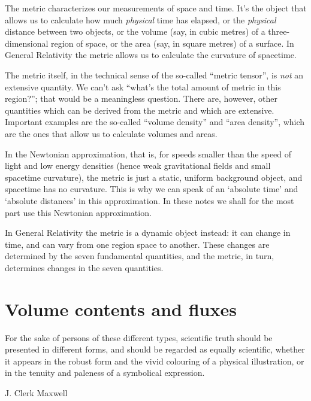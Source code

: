 \documentclass[a4paper,12pt,%
onecolumn,oneside,%
british%
]{memoir}
\renewcommand*{\|}[1][]{\nonscript\:#1\vert\nonscript\:\mathopen{}}
\begin{document}
The metric characterizes our measurements of space and time. It's the object that allows us to calculate how much \emph{physical} time has elapsed, or the \emph{physical} distance between two objects, or the volume (say, in cubic metres) of a three-dimensional region of space, or the area (say, in square metres) of a surface. In General Relativity the metric allows us to calculate the curvature of spacetime.

The metric itself, in the technical sense of the so-called \enquote{metric tensor}, is \emph{not} an extensive quantity. We can't ask \enquote{what's the total amount of metric in this region?}; that would be a meaningless question. There are, however, other quantities which can be derived from the metric and which are extensive. Important examples are the so-called \enquote{volume density} and \enquote{area density}, which are the ones that allow us to calculate volumes and areas.

In the Newtonian approximation, that is, for speeds smaller than the speed of light and low energy densities (hence weak gravitational fields and small spacetime curvature), the metric is just a static, uniform background object, and spacetime has no curvature. This is why we can speak of an \enquote*{absolute time} and \enquote*{absolute distances} in this approximation. In these notes we shall for the most part use this Newtonian approximation.

In General Relativity the metric is a dynamic object instead: it can change in time, and can vary from one region space to another. These changes are determined by the seven fundamental quantities, and the metric, in turn, determines changes in the seven quantities.




\printpagenotes*
\clearpage
\chapter{Volume contents and fluxes}
\label{cha:total_flux}


\epigraph{For the sake of persons of these different types, scientific truth should be presented in different forms, and should be regarded as equally scientific, whether it appears in the robust form and the vivid colouring of a physical illustration, or in the tenuity and paleness of a symbolical expression.%
}{J. Clerk Maxwell \cites*{maxwell1870}}
\end{document}
